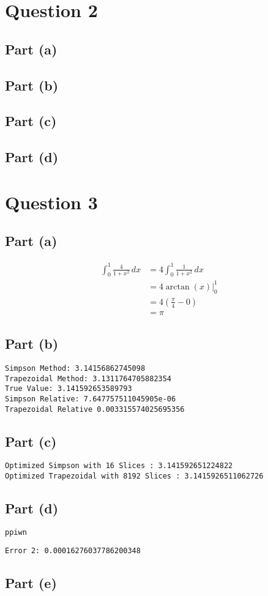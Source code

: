 \documentclass[reprint, amsmath,amssymb, aps]{revtex4-2}
\begin{document}


\section{Question 2}
\subsection{Part (a)}
\subsection{Part (b)}
\subsection{Part (c)}
\subsection{Part (d)}

\section{Question 3}
\subsection{Part (a)}
    \begin{align*}
        \int_{0}^{1} \frac{4}{1 + x^2}\,dx &= 4 \int_{0}^{1} \frac{1}{1 + x^2}\,dx \\
        &= 4 \arctan(x) \Big|_{0}^{1} \\
        &= 4 (\frac{\pi}{4} - 0) \\
        &= \pi
    \end{align*}
\subsection{Part (b)}
\begin{lstlisting}[style=console]
Simpson Method: 3.14156862745098
Trapezoidal Method: 3.1311764705882354
True Value: 3.141592653589793
Simpson Relative: 7.647757511045905e-06
Trapezoidal Relative 0.003315574025695356
\end{lstlisting}
\subsection{Part (c)}
\begin{lstlisting}[style=console]
Optimized Simpson with 16 Slices : 3.141592651224822
Optimized Trapezoidal with 8192 Slices : 3.1415926511062726
\end{lstlisting}
\subsection{Part (d)}
\begin{lstlisting}[language=python]
ppiwn
\end{lstlisting}

\begin{lstlisting}[style=console]
Error 2: 0.00016276037786200348
\end{lstlisting}
\subsection{Part (e)}

           
\end{document}

